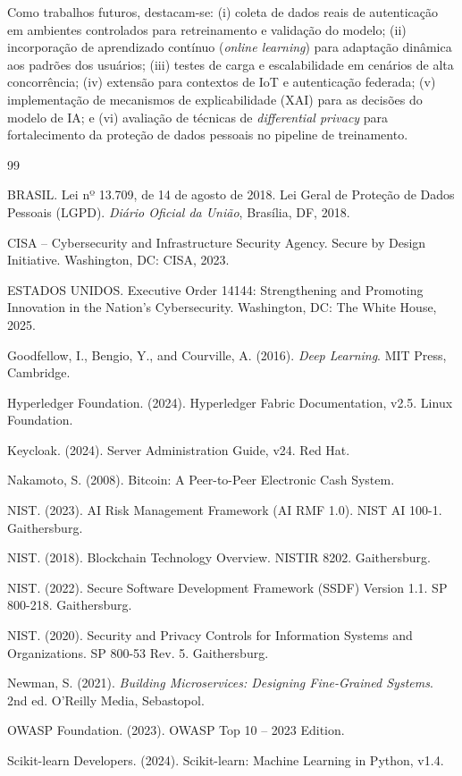 \documentclass[12pt]{article}
\begin{document}
Como trabalhos futuros, destacam-se: (i) coleta de dados reais de autenticação em ambientes controlados para retreinamento e validação do modelo; (ii) incorporação de aprendizado contínuo (\textit{online learning}) para adaptação dinâmica aos padrões dos usuários; (iii) testes de carga e escalabilidade em cenários de alta concorrência; (iv) extensão para contextos de IoT e autenticação federada; (v) implementação de mecanismos de explicabilidade (XAI) para as decisões do modelo de IA; e (vi) avaliação de técnicas de \textit{differential privacy} para fortalecimento da proteção de dados pessoais no pipeline de treinamento.



\begin{thebibliography}{99}

BRASIL. Lei nº 13.709, de 14 de agosto de 2018. Lei Geral de Proteção de Dados Pessoais (LGPD). \textit{Diário Oficial da União}, Brasília, DF, 2018.

CISA -- Cybersecurity and Infrastructure Security Agency. Secure by Design Initiative. Washington, DC: CISA, 2023.

ESTADOS UNIDOS. Executive Order 14144: Strengthening and Promoting Innovation in the Nation's Cybersecurity. Washington, DC: The White House, 2025.

Goodfellow, I., Bengio, Y., and Courville, A. (2016). \textit{Deep Learning}. MIT Press, Cambridge.

Hyperledger Foundation. (2024). Hyperledger Fabric Documentation, v2.5. Linux Foundation.

Keycloak. (2024). Server Administration Guide, v24. Red Hat.

Nakamoto, S. (2008). Bitcoin: A Peer-to-Peer Electronic Cash System.

NIST. (2023). AI Risk Management Framework (AI RMF 1.0). NIST AI 100-1. Gaithersburg.

NIST. (2018). Blockchain Technology Overview. NISTIR 8202. Gaithersburg.

NIST. (2022). Secure Software Development Framework (SSDF) Version 1.1. SP 800-218. Gaithersburg.

NIST. (2020). Security and Privacy Controls for Information Systems and Organizations. SP 800-53 Rev. 5. Gaithersburg.

Newman, S. (2021). \textit{Building Microservices: Designing Fine-Grained Systems}. 2nd ed. O'Reilly Media, Sebastopol.

OWASP Foundation. (2023). OWASP Top 10 -- 2023 Edition.

Scikit-learn Developers. (2024). Scikit-learn: Machine Learning in Python, v1.4.

\end{thebibliography}
\end{document}
